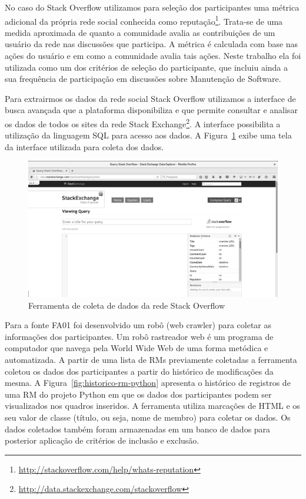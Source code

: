 No caso do Stack Overflow utilizamos para seleção dos participantes uma métrica
adicional da própria rede social conhecida como
reputação\footnote{\url{http://stackoverflow.com/help/whats-reputation}}.
Trata-se de uma medida aproximada de quanto a comunidade avalia as
contribuições de um usuário da rede nas discussões que participa. A métrica é
calculada com base nas ações do usuário e em como a comunidade avalia tais
ações. Neste trabalho ela foi utilizada como um dos critérios de seleção do
participante, que incluiu ainda a sua frequência de participação em discussões
sobre Manutenção de Software.

Para extrairmos os dados da rede social Stack Overflow utilizamos a interface de
busca avançada que a plataforma disponibiliza e que permite consultar e analisar
os dados de todos os sites da rede Stack
Exchange\footnote{\url{http://data.stackexchange.com/stackoverflow}}. A
interface possibilita a utilização da linguagem SQL para acesso aos dados. A
Figura~\ref{fig:stack-exchange} exibe uma tela da interface utilizada para
coleta dos dados.

\begin{figure}[htpb]
	\centering
	\includegraphics[width=0.7\linewidth]{./chapter-pesquisa-com-profissionais/img/stack-exchange.png}
	\caption{Ferramenta de coleta de dados da rede Stack Overflow}\label{fig:stack-exchange}
\end{figure}

Para a fonte FA01 foi desenvolvido um robô (web crawler) para coletar as
informações dos participantes. Um robô rastreador web é um programa de
computador que navega pela World Wide Web de uma forma metódica e automatizada.
A partir de uma lista de RMs previamente coletadas a ferramenta coletou os dados
dos participantes a partir do histórico de modificações da mesma. A
Figura~\ref{fig:historico-rm-python} apresenta o histórico de registros de uma
RM do projeto Python em que os dados dos participantes podem ser visualizados
nos quadros inseridos. A ferramenta utiliza marcações de HTML e os seu valor de
classe (título, ou seja, nome de membro) para coletar os dados. Os dados
coletados também foram armazenadas em um banco de dados para posterior aplicação
de critérios de inclusão e exclusão.

